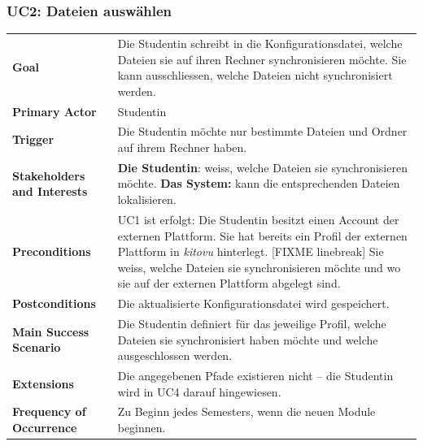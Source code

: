 \documentclass[a4paper]{article}
\begin{document}
\subsubsection{UC2: Dateien auswählen}
\begin{tabulary}{\linewidth}{lp{30em}}
	\textbf{Goal} & Die Studentin schreibt in die Konfigurationsdatei, welche Dateien sie auf ihren Rechner synchronisieren möchte. Sie kann ausschliessen, welche Dateien nicht synchronisiert werden.\\
	\textbf{Primary Actor} & Studentin\\
	\textbf{Trigger} & Die Studentin möchte nur bestimmte Dateien und Ordner auf ihrem Rechner haben.\\
	\textbf{Stakeholders and Interests} & \textbf{Die Studentin}: weiss, welche Dateien sie synchronisieren möchte. \textbf{Das System:} kann die entsprechenden Dateien lokalisieren. \\
	\textbf{Preconditions} & UC1 ist erfolgt: Die Studentin besitzt einen Account der externen Plattform. Sie hat bereits ein Profil der externen Plattform in \emph{kitovu} hinterlegt. [FIXME linebreak] Sie weiss, welche Dateien sie synchronisieren möchte und wo sie auf der externen Plattform abgelegt sind. \\
	\textbf{Postconditions} & Die aktualisierte Konfigurationsdatei wird gespeichert.\\
	\textbf{Main Success Scenario} & Die Studentin definiert für das jeweilige Profil, welche Dateien sie synchronisiert haben möchte und welche ausgeschlossen werden. \\
	\textbf{Extensions} & Die angegebenen Pfade existieren nicht -- die Studentin wird in UC4 darauf hingewiesen.\\
	\textbf{Frequency of Occurrence} & Zu Beginn jedes Semesters, wenn die neuen Module beginnen. \\
\end{tabulary}
\end{document}
